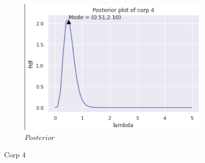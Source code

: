 \documentclass[english,a4paper,12pt]{article}
\begin{document}
\begin{enumerate}
\begin{itemize}
{\begin{figure} [h!]
\begin{subfigure}[b]{0.3\textwidth}
         \includegraphics[width=\textwidth]{pictures/Q3/Posterior_C4.png}
         \caption{$Posterior$}
         \label{Posterior}
     \end{subfigure}
     \caption{Corp 4}
        \label{Corp 4 }
\end{figure}}


\end{itemize}
\end{enumerate}
\end{document}
